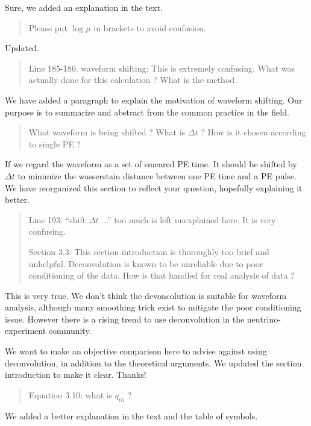 \documentclass[12pt]{article}
\begin{document}
Sure, we added an explanation in the text.

\begin{quote}
Please put $\log\mu$ in brackets to avoid confusion.
\end{quote}

Updated.

\begin{quote}
Line 185-186: waveform shifting: This is extremely confusing. What was actually done for this calculation ? What is the method. 
\end{quote}

We have added a paragraph to explain the motivation of waveform shifting.  Our purpose is to summarize and abstract from the common practice in the field. 

\begin{quote}
What waveform is being shifted ? What is $\Delta t$ ? How is it chosen according to single PE ?
\end{quote}

If we regard the waveform as a set of smeared PE time. It should be shifted by $\Delta t$ to minimize the wasserstain distance between one PE time and a PE pulse. We have reorganized this section to reflect your question, hopefully explaining it better.

\begin{quote}
Line 193: ``shift $\Delta t$ ...'' too much is left unexplained here. It is very confusing.

Section 3.3: This section introduction is thoroughly too brief and unhelpful. Deconvolution is known to be unreliable due to poor conditioning of the data. How is that handled for real analysis of data ?
\end{quote}

This is very true.  We don't think the devoncolution is suitable for waveform analysis, although many smoothing trick exist to mitigate the poor conditioning issue.  However there is a rising trend to use deconvolution in the neutrino-experiment community.

We want to make an objective comparison here to advise against using deconvolution, in addition to the theoretical arguments.  We updated the section introduction to make it clear.  Thanks!

\begin{quote}
Equation 3.10: what is $q_{th}$ ?
\end{quote}

We added a better explanation in the text and the table of symbols.
\end{document}
